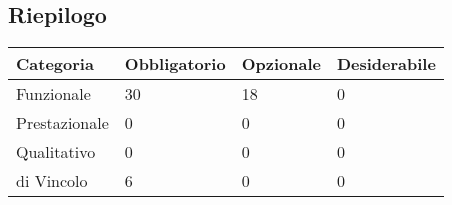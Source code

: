 \subsection{Riepilogo}

\begin{longtable}{|P{3cm}|P{3cm}|P{3cm}|P{3cm}|}
	\hline \textbf{Categoria} & \textbf{Obbligatorio} & \textbf{Opzionale} & \textbf{Desiderabile} \\
	\hline Funzionale & 30 & 18 & 0 \\
	\hline Prestazionale & 0 & 0 & 0 \\
	\hline Qualitativo & 0 & 0 & 0 \\
	\hline di Vincolo & 6 & 0 & 0 \\
	\hline
\end{longtable}
